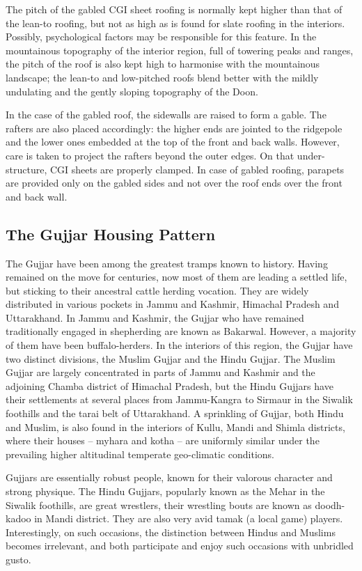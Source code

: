 The pitch of the gabled CGI sheet roofing is normally kept higher than that of the lean-to roofing, but not as high as is found for slate roofing in the interiors. Possibly, psychological factors may be responsible for this feature. In the mountainous topography of the interior region, full of towering peaks and ranges, the pitch of the roof is also kept high to harmonise with the mountainous landscape; the lean-to and low-pitched roofs blend better with the mildly undulating and the gently sloping topography of the Doon.

In the case of the gabled roof, the sidewalls are raised to form a gable. The rafters are also placed accordingly: the higher ends are jointed to the ridgepole and the lower ones embedded at the top of the front and back walls. However, care is taken to project the rafters beyond the outer edges. On that under-structure, CGI sheets are properly clamped. In case of gabled roofing, parapets are provided only on the gabled sides and not over the roof ends over the front and back wall.


\subsection*{The Gujjar Housing Pattern}

The Gujjar have been among the greatest tramps known to history. Having remained on the move for centuries, now most of them are leading a settled life, but sticking to their ancestral cattle herding vocation. They are widely distributed in various pockets in Jammu and Kashmir, Himachal Pradesh and Uttarakhand. In Jammu and Kashmir, the Gujjar who have remained traditionally engaged in shepherding are known as Bakarwal. However, a majority of them have been buffalo-herders. In the interiors of this region, the Gujjar have two distinct divisions, the Muslim Gujjar and the Hindu Gujjar. The Muslim Gujjar are largely concentrated in parts of Jammu and Kashmir and the adjoining Chamba district of Himachal Pradesh, but the Hindu Gujjars have their settlements at several places from Jammu-Kangra to Sirmaur in the Siwalik foothills and the tarai belt of Uttarakhand. A sprinkling of Gujjar, both Hindu and Muslim, is also found in the interiors of Kullu, Mandi and Shimla districts, where their houses – myhara and kotha – are uniformly similar under the prevailing higher altitudinal temperate geo-climatic conditions.

Gujjars are essentially robust people, known for their valorous character and strong physique. The Hindu Gujjars, popularly known as the Mehar in the Siwalik foothills, are great wrestlers, their wrestling bouts are known as doodh-kadoo in Mandi district. They are also very avid tamak (a local game) players. Interestingly, on such occasions, the distinction between Hindus and Muslims becomes irrelevant, and both participate and enjoy such occasions with unbridled gusto.

